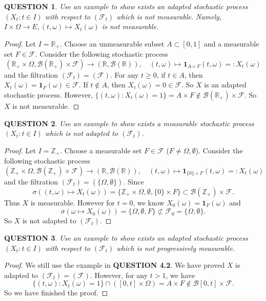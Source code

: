 \documentclass[12pt]{article}
\renewcommand{\b}{\mathscr{B}}
\renewcommand{\i}{\bm{1}}
\renewcommand{\(}{\left(}%
\renewcommand{\)}{\right)}%
\renewcommand{\[}{\left[}%
\renewcommand{\]}{\right]}%
\renewcommand{\r}{\mathbb{R}}
\newcommand{\z}{\mathbb{Z}}
\newcommand{\f}{\mathscr{F}}
\newtheorem{question}{QUESTION}[section]}
\newtheorem{proof}{Proof.}}
\begin{document}
  \begin{question}
   Use an example to show exists an adapted stochastic process $(X_t:t\in I)$ with respect to $(\f_t)$ which is not measurable. Namely, $I\times\Omega\to E,(t,\omega)\mapsto X_t(\omega )$ is not measurable.
  \end{question}
  \begin{proof}
   Let $I=\r_+$. Choose an unmeasurable subset $A\subset [0,1]$ and a measurable set $F\in\f$. Consider the following stochastic process
   \begin{equation*}
    (\r_+\times\Omega,\b(\r_+)\times\f)\to (\r,\b(\r)),\quad(t,\omega )\mapsto \i_{A\times F}(t,\omega)=:X_t(\omega )
   \end{equation*}
    and the filtration $(\f_t)=(\f)$. For any $t\geq 0$, if $t\in A$, then $X_t(\omega)=\i_F(\omega)\in\f$. If $t\notin A$, then $X_t(\omega )=0\in\f$. So $X$ is an adapted stochastic process. However, $\{(t,\omega ):X_t(\omega )=1\}=A\times F\notin \b(\r_+)\times\f$. So $X$ is not measurable.
  \end{proof}

  \begin{question}
   Use an example to show exists a measurable stochastic process $(X_t:t\in I)$ which is not adapted to $(\f_t)$.
  \end{question}
  \begin{proof}
   Let $I=\z_+$. Choose a measurable set $F\in\f$ ($F\neq\Omega,\emptyset$). Consider the following stochastic process
   \begin{equation*}
    (\z_+\times\Omega,\b(\z_+)\times\f)\to (\r,\b(\r)),\quad(t,\omega )\mapsto \i_{\{0\}\times F}(t,\omega)=:X_t(\omega )
   \end{equation*}
   and the filtration $(\f_t)=(\{\Omega,\emptyset\} )$. Since
   \begin{equation*}
    \sigma((t,\omega )\mapsto X_t(\omega ))=\{\z_+\times\Omega,\emptyset, \{0\}\times F\}\subset \b(\z_+)\times\f.
   \end{equation*}
   Thus $X$ is measurable. However for $t=0$, we know $X_0(\omega )=\i_F(\omega )$ and
   \begin{equation*}
    \sigma(\omega\mapsto X_0(\omega ))=\{\Omega,\emptyset,F \}\not\subset \f_0=\{\Omega,\emptyset\}.
   \end{equation*}
   So $X$ is not adapted to $(\f_t)$.
  \end{proof}

  \begin{question}
   Use an example to show exists an adapted stochastic process $(X_t:t\in I)$ with respect to $(\f_t)$ which is not progressively measurable.
  \end{question}
  \begin{proof}
   We still use the example in {\bfseries QUESTION 4.2}. We have proved $X$ is adapted to $(\f_t)=(\f)$. However, for any $t>1$, we have
   \begin{equation*}
    \{(t,\omega ):X_t(\omega )=1\}\cap([0,t]\times\Omega)  =A\times F\notin \b[0,t]\times\f.
   \end{equation*}
   So we have finished the proof.
  \end{proof}
\end{document}

